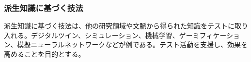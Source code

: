 \subsubsection{派生知識に基づく技法}
派生知識に基づく技法は、他の研究領域や文脈から得られた知識をテストに取り入れる。デジタルツイン、シミュレーション、機械学習、ゲーミフィケーション、模擬ニューラルネットワークなどが例である。テスト活動を支援し、効果を高めることを目的とする。
